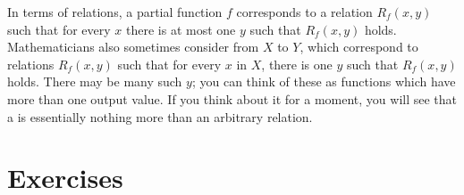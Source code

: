 \documentclass[letterpaper,10pt,english]{sphinxmanual}
\begin{document}
\sphinxAtStartPar
In terms of relations, a partial function \(f\) corresponds to a relation \(R_f(x,y)\) such that for every \(x\) there is at most one \(y\) such that \(R_f(x,y)\) holds. Mathematicians also sometimes consider  from \(X\) to \(Y\), which correspond to relations \(R_f(x,y)\) such that for every \(x\) in \(X\), there is  one \(y\) such that \(R_f(x,y)\) holds. There may be many such \(y\); you can think of these as functions which have more than one output value. If you think about it for a moment, you will see that a  is essentially nothing more than an arbitrary relation.


\section{Exercises}
\end{document}
